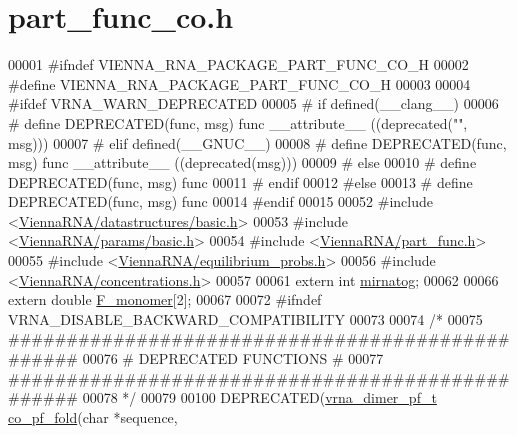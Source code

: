 \hypertarget{part__func__co_8h_source}{}\section{part\+\_\+func\+\_\+co.\+h}
\label{part__func__co_8h_source}

\begin{DoxyCode}
00001 \textcolor{preprocessor}{#ifndef VIENNA\_RNA\_PACKAGE\_PART\_FUNC\_CO\_H}
00002 \textcolor{preprocessor}{#define VIENNA\_RNA\_PACKAGE\_PART\_FUNC\_CO\_H}
00003 
00004 \textcolor{preprocessor}{#ifdef VRNA\_WARN\_DEPRECATED}
00005 \textcolor{preprocessor}{# if defined(\_\_clang\_\_)}
00006 \textcolor{preprocessor}{#  define DEPRECATED(func, msg) func \_\_attribute\_\_ ((deprecated("", msg)))}
00007 \textcolor{preprocessor}{# elif defined(\_\_GNUC\_\_)}
00008 \textcolor{preprocessor}{#  define DEPRECATED(func, msg) func \_\_attribute\_\_ ((deprecated(msg)))}
00009 \textcolor{preprocessor}{# else}
00010 \textcolor{preprocessor}{#  define DEPRECATED(func, msg) func}
00011 \textcolor{preprocessor}{# endif}
00012 \textcolor{preprocessor}{#else}
00013 \textcolor{preprocessor}{# define DEPRECATED(func, msg) func}
00014 \textcolor{preprocessor}{#endif}
00015 
00052 \textcolor{preprocessor}{#include <\hyperlink{datastructures_2basic_8h}{ViennaRNA/datastructures/basic.h}>}
00053 \textcolor{preprocessor}{#include <\hyperlink{params_2basic_8h}{ViennaRNA/params/basic.h}>}
00054 \textcolor{preprocessor}{#include <\hyperlink{part__func_8h}{ViennaRNA/part\_func.h}>}
00055 \textcolor{preprocessor}{#include <\hyperlink{equilibrium__probs_8h}{ViennaRNA/equilibrium\_probs.h}>}
00056 \textcolor{preprocessor}{#include <\hyperlink{concentrations_8h}{ViennaRNA/concentrations.h}>}
00057 
00061 \textcolor{keyword}{extern} \textcolor{keywordtype}{int}    \hyperlink{group__pf__cofold_gaff27888c4088cc1f60fd59cbd589474c}{mirnatog};
00062 
00066 \textcolor{keyword}{extern} \textcolor{keywordtype}{double} \hyperlink{group__pf__cofold_gac2d1851a710a8561390861155ca988fe}{F\_monomer}[2];
00067 
00072 \textcolor{preprocessor}{#ifndef VRNA\_DISABLE\_BACKWARD\_COMPATIBILITY}
00073 
00074 \textcolor{comment}{/*}
00075 \textcolor{comment}{ #################################################}
00076 \textcolor{comment}{ # DEPRECATED FUNCTIONS                          #}
00077 \textcolor{comment}{ #################################################}
00078 \textcolor{comment}{ */}
00079 
00100 DEPRECATED(\hyperlink{group__part__func__global_structvrna__dimer__pf__s}{vrna\_dimer\_pf\_t} \hyperlink{group__part__func__global__deprecated_gae5c1e7331718669bdae7a86de2be6184}{co\_pf\_fold}(\textcolor{keywordtype}{char}  *sequence,

\end{DoxyCode}

